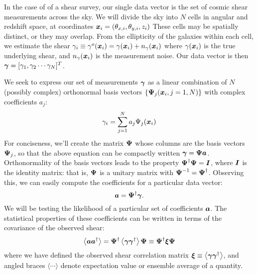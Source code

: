 In the case of of a shear survey, our single data vector is the set of
cosmic shear measurements across the sky.  We will divide the sky into $N$
cells in angular and redshift space, at coordinates
$\boldsymbol{x}_i = (\theta_{x,i}, \theta_{y,i}, z_i)$
These cells may be spatially distinct, or they may overlap.
From the ellipticity of the galaxies within each cell, we
estimate the shear
$\gamma_i \equiv \gamma^o(\boldsymbol{x}_i) = 
\gamma(\boldsymbol{x}_i) + n_\gamma(\boldsymbol{x}_i)$
where $\gamma(\boldsymbol{x}_i)$ is the true underlying shear,
and $n_\gamma(\boldsymbol{x}_i)$ is the measurement noise.
Our data vector is then
$\boldsymbol{\gamma} = [\gamma_1, \gamma_2 \cdots \gamma_N]^T$.

We seek to express our set of measurements $\boldsymbol{\gamma}$
as a linear combination of $N$ (possibly complex) 
orthonormal basis vectors
$\{\boldsymbol{\Psi}_j(\boldsymbol{x}_i, j=1,N)\}$ with complex coefficients
$a_j$:
\begin{equation}
  \label{eq:gamma_decomp}
  \gamma_i = \sum_{j=1}^{N} a_j \Psi_j(\boldsymbol{x}_i)
\end{equation}
For conciseness, we'll create the matrix $\boldsymbol{\Psi}$ whose columns are
the basis vectors $\boldsymbol{\Psi}_j$, so that the above equation can be
compactly written $\boldsymbol{\gamma} = \boldsymbol{\Psi}\boldsymbol{a}$.  Orthonormality
of the basis vectors leads to the property
$\boldsymbol{\Psi}^\dagger\boldsymbol{\Psi} = \boldsymbol{I}$, where $\boldsymbol{I}$ is the identity
matrix: that is, $\boldsymbol{\Psi}$ is a unitary matrix with
$\boldsymbol{\Psi}^{-1} = \boldsymbol{\Psi}^\dagger$.  Observing this, we can easily compute
the coefficients for a particular data vector:
\begin{equation}
  \boldsymbol{a} = \boldsymbol{\Psi}^\dagger \boldsymbol{\gamma}.
\end{equation}
We will be testing the likelihood of a particular set of coefficients
$\boldsymbol{a}$.  
The statistical properties of these coefficients can be written in terms of
the covariance of the observed shear:
\begin{equation}
  \label{eq:a_cov}
  \left\langle \boldsymbol{a}\boldsymbol{a}^\dagger \right\rangle 
  =  \boldsymbol{\Psi}^\dagger
  \left\langle \boldsymbol{\gamma}\boldsymbol{\gamma}^\dagger \right\rangle 
  \boldsymbol{\Psi}
  \equiv \boldsymbol{\Psi}^\dagger \boldsymbol{\xi}  \boldsymbol{\Psi}
\end{equation}
where we have defined the observed shear correlation matrix 
$\boldsymbol{\xi} \equiv \left\langle 
\boldsymbol{\gamma}\boldsymbol{\gamma}^\dagger \right\rangle$, and angled braces
$\langle\cdots\rangle$ denote expectation value or ensemble average
of a quantity.


